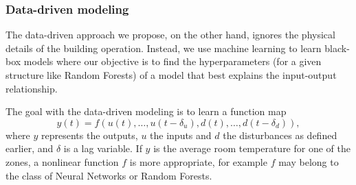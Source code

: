 \subsubsection{Data-driven modeling}
The data-driven approach we propose, on the other hand, ignores the physical details of the building operation. Instead, we use machine learning to learn black-box models where our objective is to find the hyperparameters (for a given structure like Random Forests) of a model that best explains the input-output relationship.

The goal with the data-driven modeling is to learn a function map
\begin{equation}
y(t) = f(u(t),\dots,u(t-\delta_u), d(t),\dots, d(t-\delta_d)),
\end{equation}
where \(y\) represents the outputs, \(u\) the inputs and \(d\) the disturbances as defined earlier, and \(\delta\) is a lag variable. If \(y\) is the average room temperature for one of the zones, a nonlinear function \(f\) is more appropriate, for example \(f\) may belong to the class of Neural Networks or Random Forests.


